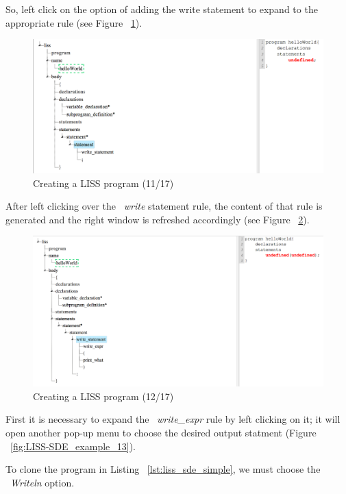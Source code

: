 \documentclass[
  oneside,
  11pt, a4paper,
  footinclude=true,
  headinclude=true,
  cleardoublepage=empty
]{scrbook}
\begin{document}
So, left click on the option of adding the write statement to expand to the appropriate rule (see Figure ~\ref{fig:LISS-SDE_example_11}).

\begin{figure}[h!]
  \centering
    \includegraphics[width=1\textwidth]{img/LISS-SDE_creating_program/LISS-SDE11.png}
    \caption{Creating a LISS program (11/17)}
    \label{fig:LISS-SDE_example_11}
\end{figure}

After left clicking over the ~\textit{write} statement rule, the content of that rule is generated and the right window is refreshed accordingly (see Figure ~\ref{fig:LISS-SDE_example_12}).

\begin{figure}[h!]
  \centering
    \includegraphics[width=1\textwidth]{img/LISS-SDE_creating_program/LISS-SDE12.png}
    \caption{Creating a LISS program (12/17)}
    \label{fig:LISS-SDE_example_12}
\end{figure}

First it is necessary to expand the ~\textit{write\_expr} rule by left clicking on it; it will open another pop-up menu to choose the desired output statment (Figure ~\ref{fig:LISS-SDE_example_13}).

To clone the program in Listing ~\ref{lst:liss_sde_simple}, we must choose the ~\textit{Writeln} option.
\end{document}
